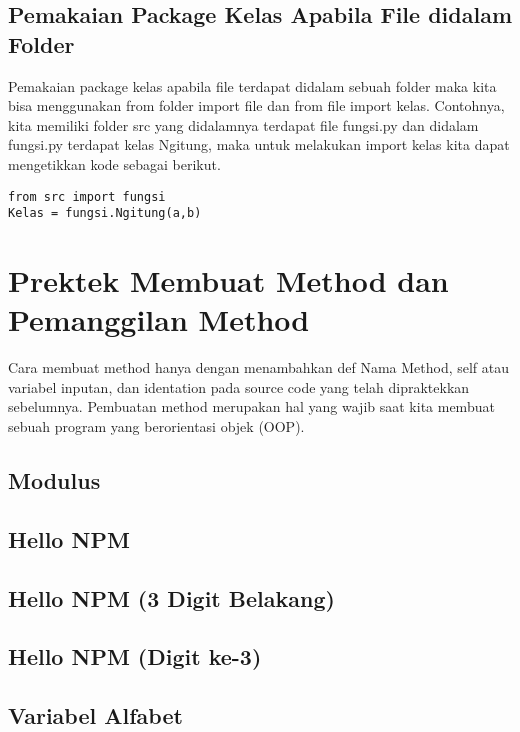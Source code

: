 \subsection{Pemakaian Package Kelas Apabila File didalam Folder}
Pemakaian package kelas apabila file terdapat didalam sebuah folder maka kita bisa menggunakan from folder import file dan from file import kelas. Contohnya, kita memiliki folder src yang didalamnya terdapat file fungsi.py dan didalam fungsi.py terdapat kelas Ngitung, maka untuk melakukan import kelas kita dapat mengetikkan kode sebagai berikut.
\begin{verbatim}
from src import fungsi
Kelas = fungsi.Ngitung(a,b)
\end{verbatim}

\section{Prektek Membuat Method dan Pemanggilan Method}
Cara membuat method hanya dengan menambahkan def Nama Method, self atau variabel inputan, dan identation pada source code yang telah dipraktekkan sebelumnya. Pembuatan method merupakan hal yang wajib saat kita membuat sebuah program yang berorientasi objek (OOP).
\subsection{Modulus}

\subsection{Hello NPM}

\subsection{Hello NPM (3 Digit Belakang)}

\subsection{Hello NPM (Digit ke-3)}

\subsection{Variabel Alfabet}

